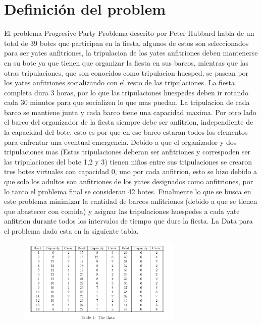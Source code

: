 \documentclass[spanish, fleqn]{article}
\begin{document}
\section{Definición del problem}

El problema Progresive Party Problema descrito por Peter Hubbard habla de un total de 39 botes que participan en la fiesta, algunos de estos son seleccionados para ser yates anfitriones, la tripulacion de los yates anfitriones deben mantenerse en su bote ya que tienen que organizar la fiesta en sus barcos, mientras que las otras tripulaciones, que son conocidos como tripulacion huesped, se pasean por los yates anfitriones socializando con el resto de las tripulaciones. La fiesta completa dura 3 horas, por lo que las tripulaciones huespedes deben ir rotando cada 30 minutos para que socializen lo que mas puedan. La tripulacion de cada barco se mantiene junta y cada barco tiene una capacidad maxima. Por otro lado el barco del organizador de la fiesta siempre debe ser anfitrion, independiente de la capacidad del bote, esto es por que en ese barco estaran todos los elementos para enfrentar una eventual emergencia. Debido a que el organizador y dos tripulaciones mas (Estas tripulaciones deberan ser anfitriones y correspoden ser las tripulaciones del bote 1,2 y 3) tienen niños entre sus tripulaciones  se crearon tres botes virtuales con capacidad 0, uno por cada anfitrion, esto se hizo debido a que solo los adultos son anfitriones de los yates designados como anfitriones, por lo tanto el problema final se consideran 42 botes. Finalmente lo que se busca en este problema minimizar la cantidad de barcos anfitriones (debido a que se tienen que abastecer con comida) y asignar las tripulaciones huespedes a cada yate anfitrion durante todos los intervalos de tiempo que dure la fiesta. La Data para el problema dado esta en la siguiente tabla.

\begin{figure}[!h]
  \centering
    \includegraphics[width=0.7\textwidth]{1}
  \label{fig:DiagramaBarra1}
\end{figure}
\end{document}
